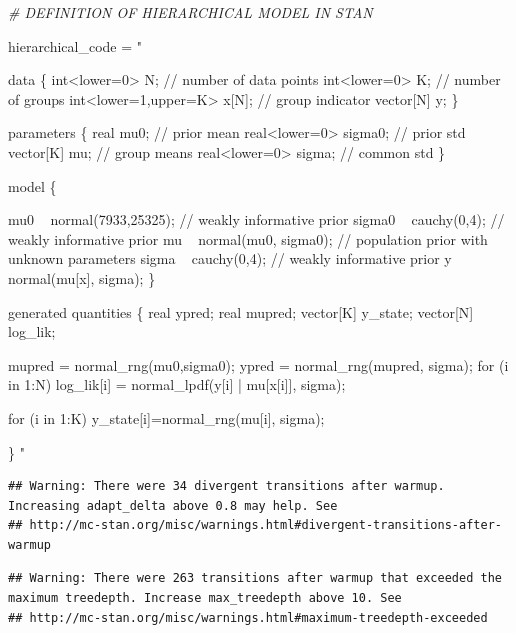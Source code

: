 \documentclass[]{article}
\newenvironment{Shaded}{\begin{snugshade}}{\end{snugshade}}
\newcommand{\StringTok}[1]{\textcolor[rgb]{0.31,0.60,0.02}{#1}}
\newcommand{\CommentTok}[1]{\textcolor[rgb]{0.56,0.35,0.01}{\textit{#1}}}
\newcommand{\NormalTok}[1]{#1}
\begin{document}
\begin{Shaded}
\begin{Highlighting}[]
\CommentTok{# DEFINITION OF HIERARCHICAL MODEL IN STAN }

\NormalTok{hierarchical_code =}\StringTok{ "}

\StringTok{data \{}
\StringTok{  int<lower=0> N;           // number of data points}
\StringTok{  int<lower=0> K;           // number of groups}
\StringTok{  int<lower=1,upper=K> x[N]; // group indicator}
\StringTok{  vector[N] y;              }
\StringTok{\}}

\StringTok{parameters \{}
\StringTok{  real mu0;                 // prior mean}
\StringTok{  real<lower=0> sigma0;     // prior std}
\StringTok{  vector[K] mu;             // group means}
\StringTok{  real<lower=0> sigma;      // common std}
\StringTok{\}}

\StringTok{model \{}

\StringTok{  mu0 ~ normal(7933,25325);  // weakly informative prior}
\StringTok{  sigma0 ~ cauchy(0,4);      // weakly informative prior}
\StringTok{  mu ~ normal(mu0, sigma0);  // population prior with unknown parameters}
\StringTok{  sigma ~ cauchy(0,4);       // weakly informative prior}
\StringTok{  y ~ normal(mu[x], sigma);}
\StringTok{\}}

\StringTok{generated quantities \{}
\StringTok{  real ypred;}
\StringTok{  real mupred;}
\StringTok{  vector[K] y_state;}
\StringTok{  vector[N] log_lik; }

\StringTok{  mupred = normal_rng(mu0,sigma0);}
\StringTok{  ypred = normal_rng(mupred, sigma);}
\StringTok{  }
\StringTok{  for (i in 1:N) }
\StringTok{    log_lik[i] = normal_lpdf(y[i] | mu[x[i]], sigma); }

\StringTok{  for (i in 1:K)}
\StringTok{    y_state[i]=normal_rng(mu[i], sigma);}

\StringTok{\}}
\StringTok{"}
\end{Highlighting}
\end{Shaded}

\begin{verbatim}
## Warning: There were 34 divergent transitions after warmup. Increasing adapt_delta above 0.8 may help. See
## http://mc-stan.org/misc/warnings.html#divergent-transitions-after-warmup
\end{verbatim}

\begin{verbatim}
## Warning: There were 263 transitions after warmup that exceeded the maximum treedepth. Increase max_treedepth above 10. See
## http://mc-stan.org/misc/warnings.html#maximum-treedepth-exceeded
\end{verbatim}
\end{document}
